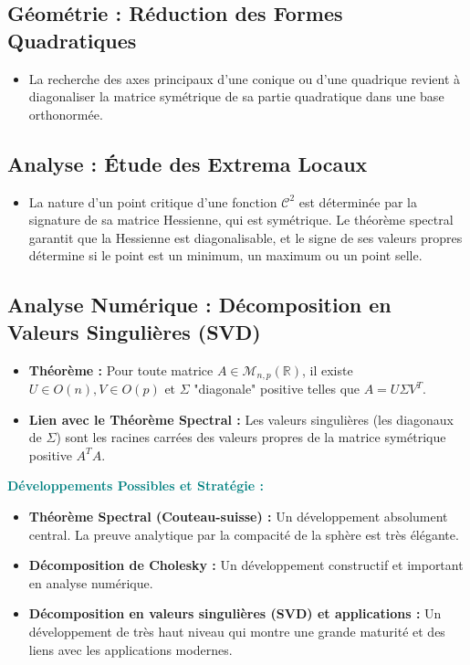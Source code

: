 \documentclass[12pt, a4paper, parskip=full]{report}
\theoremstyle{agregstyle}
\newenvironment{developpements}
  {\par\medskip\noindent\begin{oframed}\noindent\textbf{\textcolor{teal}{Développements Possibles et Stratégie :}}}
  {\end{oframed}\par\medskip}
\begin{document}
\subsection{Géométrie : Réduction des Formes Quadratiques}
\begin{itemize}
    \item La recherche des axes principaux d'une conique ou d'une quadrique revient à diagonaliser la matrice symétrique de sa partie quadratique dans une base orthonormée.
\end{itemize}
\subsection{Analyse : Étude des Extrema Locaux}
\begin{itemize}
    \item La nature d'un point critique d'une fonction $\mathcal{C}^2$ est déterminée par la signature de sa matrice Hessienne, qui est symétrique. Le théorème spectral garantit que la Hessienne est diagonalisable, et le signe de ses valeurs propres détermine si le point est un minimum, un maximum ou un point selle.
\end{itemize}
\subsection{Analyse Numérique : Décomposition en Valeurs Singulières (SVD)}
\begin{itemize}
    \item \textbf{Théorème :} Pour toute matrice $A \in \mathcal{M}_{n,p}(\mathbb{R})$, il existe $U \in O(n), V \in O(p)$ et $\Sigma$ "diagonale" positive telles que $A=U\Sigma V^T$.
    \item \textbf{Lien avec le Théorème Spectral :} Les valeurs singulières (les diagonaux de $\Sigma$) sont les racines carrées des valeurs propres de la matrice symétrique positive $A^TA$.
\end{itemize}

\begin{developpements}
    \begin{itemize}
        \item \textbf{Théorème Spectral (Couteau-suisse) :} Un développement absolument central. La preuve analytique par la compacité de la sphère est très élégante.
        \item \textbf{Décomposition de Cholesky :} Un développement constructif et important en analyse numérique.
        \item \textbf{Décomposition en valeurs singulières (SVD) et applications :} Un développement de très haut niveau qui montre une grande maturité et des liens avec les applications modernes.
    \end{itemize}
\end{developpements}
\end{document}
